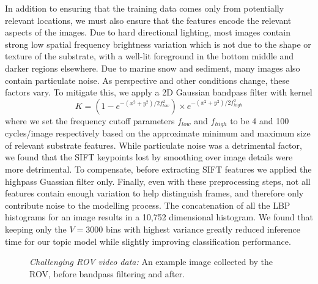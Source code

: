 In addition to ensuring that the training data comes only from potentially relevant locations, we must also ensure that the features encode the relevant aspects of the images. Due to hard directional lighting, most images contain strong low spatial frequency brightness variation which is not due to the shape or texture of the substrate, with a well-lit foreground in the bottom middle and darker regions elsewhere. Due to marine snow and sediment, many images also contain particulate noise. As perspective and other conditions change, these factors vary. To mitigate this, we apply a 2D Gaussian bandpass filter with kernel
\begin{equation}
K = (1-e^{-(x^2+y^2)/2f_{low}^2}) \times e^{-(x^2+y^2)/2f_{high}^2}
\end{equation} 
where we set the frequency cutoff parameters $f_{low}$ and $f_{high}$ to be 4 and 100 cycles/image respectively based on the approximate minimum and maximum size of relevant substrate features. While particulate noise was a detrimental factor, we found that the SIFT keypoints lost by smoothing over image details were more detrimental. To compensate, before extracting SIFT features we applied the highpass Guassian filter only. Finally, even with these preprocessing steps, not all features contain enough variation to help distinguish frames, and therefore only contribute noise to the modelling process. The concatenation of all the LBP histograms for an image results in a 10,752 dimensional histogram. We found that keeping only the $V = 3000$ bins with highest variance greatly reduced inference time for our topic model while slightly improving classification performance.

\begin{figure}
\begin{center}

%
\end{center}

\caption{
    \emph{Challenging ROV video data:}
	\protect{} An example image collected by the ROV, before bandpass filtering and 
	\protect{} after. 
}
\label{fig:rov-eg}
\end{figure}


